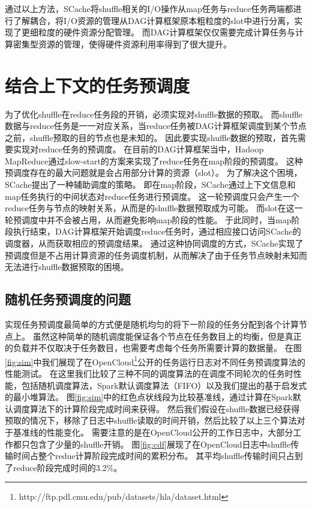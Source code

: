 通过以上方法，SCache将shuffle相关的I/O操作从map任务与reduce任务两端都进行了解耦合，将I/O资源的管理从DAG计算框架原本粗粒度的slot中进行分离，实现了更细粒度的硬件资源分配管理。
而DAG计算框架仅仅需要完成计算任务与计算密集型资源的管理，使得硬件资源利用率得到了很大提升。

\section{结合上下文的任务预调度}

为了优化shuffle在reduce任务段的开销，必须实现对shuffle数据的预取。
而shuffle数据与reduce任务是一一对应关系，当reduce任务被DAG计算框架调度到某个节点之前，shuffle预取的目的节点也是未知的。
因此要实现shuffle数据的预取，首先需要实现对reduce任务的预调度。
在目前的DAG计算框架当中，Hadoop MapReduce通过slow-start\cite{hadoop}的方案来实现了reduce任务在map阶段的预调度。
这种预调度存在的最大问题就是会占用部分计算的资源（slot）。
为了解决这个困境，SCache提出了一种辅助调度的策略。
即在map阶段，SCache通过上下文信息和map任务执行的中间状态对reduce任务进行预调度。
这一轮预调度只会产生一个reduce任务与节点的映射关系，从而是的shuffle数据预取成为可能。
而slot在这一轮预调度中并不会被占用，从而避免影响map阶段的性能。
于此同时，当map阶段执行结束，DAG计算框架开始调度reduce任务时，通过相应接口访问SCache的调度器，从而获取相应的预调度结果。
通过这种协同调度的方式，SCache实现了预调度但是不占用计算资源的任务调度机制，从而解决了由于任务节点映射未知而无法进行shuffle数据预取的困境。

\subsection{随机任务预调度的问题}

实现任务预调度最简单的方式便是随机均匀的将下一阶段的任务分配到各个计算节点上。
虽然这种简单的随机调度能保证各个节点在任务数目上的均衡，但是真正的负载并不仅取决于任务数目，也需要考虑每个任务所需要计算的数据量。
在图\ref{fig:sim}中我们展现了在OpenCloud\footnote{http://ftp.pdl.cmu.edu/pub/datasets/hla/dataset.html}公开的任务运行日志对不同任务预调度算法的性能测试。
在这里我们比较了三种不同的调度算法的在调度不同轮次的任务时性能，包括随机调度算法，Spark默认调度算法（FIFO）以及我们提出的基于启发式的最小堆算法。
图\ref{fig:sim}中的红色点状线段为比较基准线，通过计算在Spark默认调度算法下的计算阶段完成时间来获得。
然后我们假设在shuffle数据已经获得预取的情况下，移除了日志中shuffle读取的时间开销，然后比较了以上三个算法对于基准线的性能变化。
需要注意的是在OpenCloud公开的工作日志中，大部分工作都只包含了少量的shuffle开销。
图\ref{fig:cdf}展现了在OpenCloud日志中shuffle传输时间占整个redue计算阶段完成时间的累积分布。
其平均shuffle传输时间只占到了reduce阶段完成时间的3.2\%。

